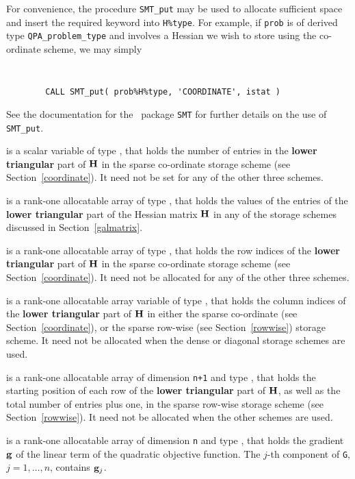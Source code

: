 \documentclass{galahad}
\newcommand{\packagename}{QPA}
\begin{document}
\begin{description}
\begin{description}
For convenience, the procedure {\tt SMT\_put} 
may be used to allocate sufficient space and insert the required keyword
into {\tt H\%type}.
For example, if {\tt prob} is of derived type {\tt \packagename\_problem\_type}
and involves a Hessian we wish to store using the co-ordinate scheme,
we may simply
{\tt 
\begin{verbatim}
        CALL SMT_put( prob%H%type, 'COORDINATE', istat )
\end{verbatim}
}
\noindent
See the documentation for the \galahad\ package {\tt SMT} 
for further details on the use of {\tt SMT\_put}.

 is a scalar variable of type \integer, that 
holds the number of entries in the {\bf lower triangular} part of ${\mathbf{H}}$
in the sparse co-ordinate storage scheme (see Section~\ref{coordinate}). 
It need not be set for any of the other three schemes.

 is a rank-one allocatable array of type \realdp, that holds
the values of the entries of the {\bf lower triangular} part
of the Hessian matrix ${\mathbf{H}}$ in any of the 
storage schemes discussed in Section~\ref{galmatrix}.

 is a rank-one allocatable array of type \integer,
that holds the row indices of the {\bf lower triangular} part of ${\mathbf{H}}$ 
in the sparse co-ordinate storage
scheme (see Section~\ref{coordinate}). 
It need not be allocated for any of the other three schemes.

 is a rank-one allocatable array variable of type \integer,
that holds the column indices of the {\bf lower triangular} part of 
${\mathbf{H}}$ in either the sparse co-ordinate 
(see Section~\ref{coordinate}), or the sparse row-wise 
(see Section~\ref{rowwise}) storage scheme.
It need not be allocated when the dense or diagonal storage schemes are used.

 is a rank-one allocatable array of dimension {\tt n+1} and type 
\integer, that holds the starting position of 
each row of the {\bf lower triangular} part of ${\mathbf{H}}$, as well
as the total number of entries plus one, in the sparse row-wise storage
scheme (see Section~\ref{rowwise}). It need not be allocated when the
other schemes are used.

\end{description}

 is a rank-one allocatable array of dimension {\tt n} and type 
\realdp, that holds the gradient ${\mathbf{g}}$ 
of the linear term of the quadratic objective function.
The $j$-th component of 
{\tt G}, $j = 1,  \ldots ,  n$, contains ${\mathbf{g}}_{j}$.


\end{description}
\end{document}
